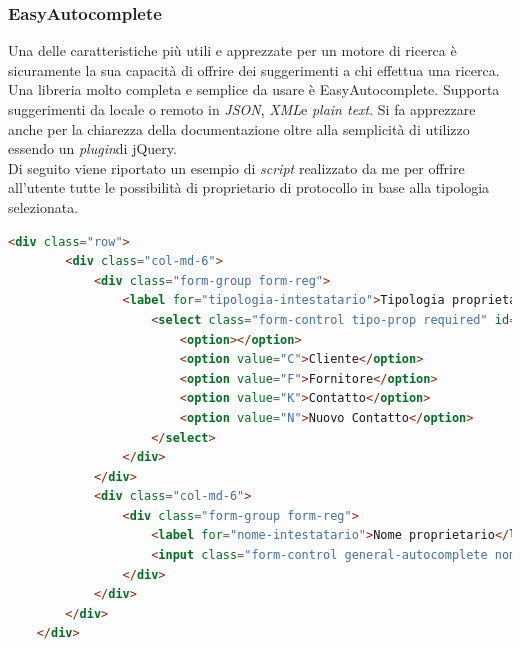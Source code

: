 \subsubsection{EasyAutocomplete}
Una delle caratteristiche più utili e apprezzate per un motore di ricerca è sicuramente la sua capacità di offrire dei suggerimenti a chi effettua una ricerca.
\\
Una libreria molto completa e semplice da usare è EasyAutocomplete. Supporta suggerimenti da locale o remoto in \emph{JSON}\glsfirstoccur, \emph{XML}\glsfirstoccur e \textit{plain text}. 
Si fa apprezzare anche per la chiarezza della documentazione oltre alla semplicità di utilizzo essendo un \emph{plugin}\glsfirstoccur di jQuery.
\\
Di seguito viene riportato un esempio di \textit{script} realizzato da me per offrire all'utente tutte le possibilità di proprietario di protocollo in base alla tipologia selezionata.
\label{EasyAutocomplete}
\begin{lstlisting}[language=HTML, caption=HTML per \textit{EasyAutocomplete}]
    <div class="row">
        <div class="col-md-6">
            <div class="form-group form-reg">
                <label for="tipologia-intestatario">Tipologia proprietario</label>
                    <select class="form-control tipo-prop required" id="tipo-prop" name="tipo_proprietario">
                        <option></option>
                        <option value="C">Cliente</option>
                        <option value="F">Fornitore</option>
                        <option value="K">Contatto</option>
                        <option value="N">Nuovo Contatto</option>
                    </select>
                </div>
            </div>
            <div class="col-md-6">
                <div class="form-group form-reg">
                    <label for="nome-intestatario">Nome proprietario</label>
                    <input class="form-control general-autocomplete nome-proprietario" id="upper" extra-params="tipo-prop" data-url="<?php echo SITE_ROOT?>/protocolli/getSco"  name="nome_proprietario" disabled>
                </div>
            </div>
        </div>
    </div>
\end{lstlisting}
